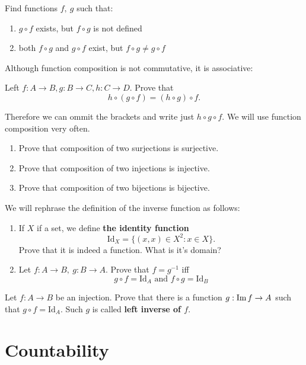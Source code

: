 \begin{prob}
	Find functions $f,~g$ such that:
	\begin{enumerate}
		\item $g\circ f$ exists, but $f\circ g$ is not defined
		\item both $f\circ g$ and $g\circ f$ exist, but $f\circ g\neq g\circ f$
	\end{enumerate}
\end{prob}

\noindent Although function composition is not commutative, it is associative:
\begin{prob}
	Left $f:A\to B, g: B\to C, h: C\to D$. Prove that
	$$h\circ (g\circ f) = (h\circ g)\circ f.$$
\end{prob}
Therefore we can ommit the brackets and write just $h\circ g\circ f.$ We will use function composition very
often.

\begin{prob}
    \begin{enumerate}
	   \item Prove that composition of two surjections is surjective.
	   \item Prove that composition of two injections is injective.
	   \item Prove that composition of two bijections is bijective.
    \end{enumerate}
\end{prob}

\begin{prob} We will rephrase the definition of the inverse function as follows:
	\begin{enumerate}
		\item If $X$ if a set, we define \textbf{the identity function}
			$$\text{Id}_X=\{(x,x)\in X^2 : x\in X\}.$$
			Prove that it is indeed a function. What is it's domain?
		\item Let $f:A\to B,~g:B\to A$. Prove that $f=g^{-1}$ iff
			$$g\circ f = \text{Id}_A \text{ and } f\circ g = \text{Id}_B$$
	\end{enumerate}
\end{prob}

\begin{prob}
  Let $f: A\to B$ be an injection. Prove that there is a function
  $g: \text{Im\,} f \to A$ such that $g\circ f = \text{Id}_A.$
  Such $g$ is called \textbf{left inverse of $f$}.
\end{prob}

\section{Countability}
